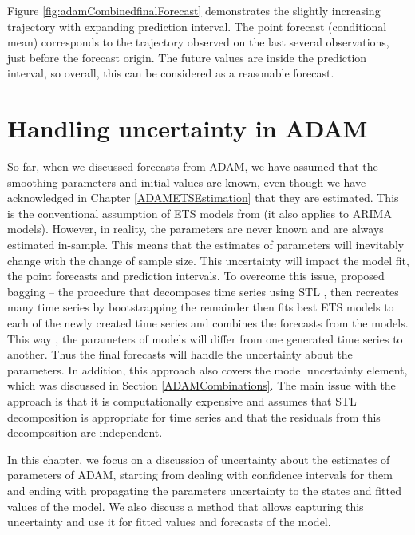 \documentclass[
]{book}
\theoremstyle{definition}
\theoremstyle{definition}
\theoremstyle{definition}
\theoremstyle{definition}
\theoremstyle{remark}
\begin{document}
Figure \ref{fig:adamCombinedfinalForecast} demonstrates the slightly increasing trajectory with expanding prediction interval. The point forecast (conditional mean) corresponds to the trajectory observed on the last several observations, just before the forecast origin. The future values are inside the prediction interval, so overall, this can be considered as a reasonable forecast.

\hypertarget{ADAMUncertainty}{%
\chapter{Handling uncertainty in ADAM}\label{ADAMUncertainty}}

So far, when we discussed forecasts from ADAM, we have assumed that the smoothing parameters and initial values are known, even though we have acknowledged in Chapter \ref{ADAMETSEstimation} that they are estimated. This is the conventional assumption of ETS models from \citet{Hyndman2008b} (it also applies to ARIMA models). However, in reality, the parameters are never known and are always estimated in-sample. This means that the estimates of parameters will inevitably change with the change of sample size. This uncertainty will impact the model fit, the point forecasts and prediction intervals. To overcome this issue, \citet{Bergmeir2016} proposed bagging -- the procedure that decomposes time series using STL \citep{Cleveland1990}, then recreates many time series by bootstrapping the remainder then fits best ETS models to each of the newly created time series and combines the forecasts from the models. This way \citep[as was explained by][]{Petropoulos2018}, the parameters of models will differ from one generated time series to another. Thus the final forecasts will handle the uncertainty about the parameters. In addition, this approach also covers the model uncertainty element, which was discussed in Section \ref{ADAMCombinations}. The main issue with the approach is that it is computationally expensive and assumes that STL decomposition is appropriate for time series and that the residuals from this decomposition are independent.

In this chapter, we focus on a discussion of uncertainty about the estimates of parameters of ADAM, starting from dealing with confidence intervals for them and ending with propagating the parameters uncertainty to the states and fitted values of the model. We also discuss a method that allows capturing this uncertainty and use it for fitted values and forecasts of the model.
\end{document}
